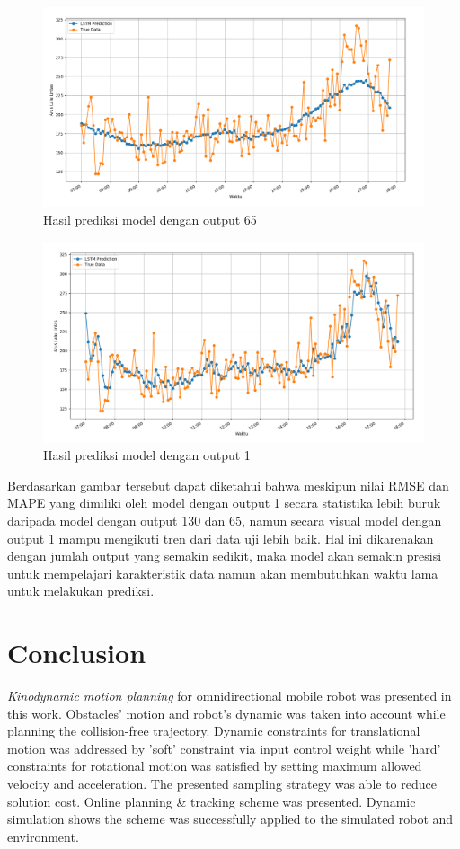 \documentclass[conference]{IEEEtran}
\begin{document}
\begin{figure}[htp]
	\centering
	\includegraphics[scale=0.3]{out_65}
	\caption{Hasil prediksi model dengan output 65}
	\label{out_65}
\end{figure}

\begin{figure}[htp]
	\centering
	\includegraphics[scale=0.3]{out_1}
	\caption{Hasil prediksi model dengan output 1}
	\label{out_1}
\end{figure}
Berdasarkan gambar tersebut dapat diketahui bahwa meskipun nilai RMSE dan MAPE yang dimiliki oleh model dengan output 1 secara statistika lebih buruk daripada model dengan output 130 dan 65, namun secara visual model dengan output 1 mampu mengikuti tren dari data uji lebih baik. Hal ini dikarenakan dengan jumlah output yang semakin sedikit, maka model akan semakin presisi untuk mempelajari karakteristik data namun
akan membutuhkan waktu lama untuk melakukan prediksi. 

\section{Conclusion} \label{conclusion}

\emph{Kinodynamic motion planning} for omnidirectional mobile robot was presented in this work. Obstacles' motion and robot's dynamic was taken into account while planning the collision-free trajectory. Dynamic constraints for translational motion was addressed by 'soft' constraint via input control weight while 'hard' constraints for rotational motion was satisfied by setting maximum allowed velocity and acceleration. The presented sampling strategy was able to reduce solution cost. Online planning \& tracking scheme was presented. Dynamic simulation shows the scheme was successfully applied to the simulated robot and environment.



\end{document}

